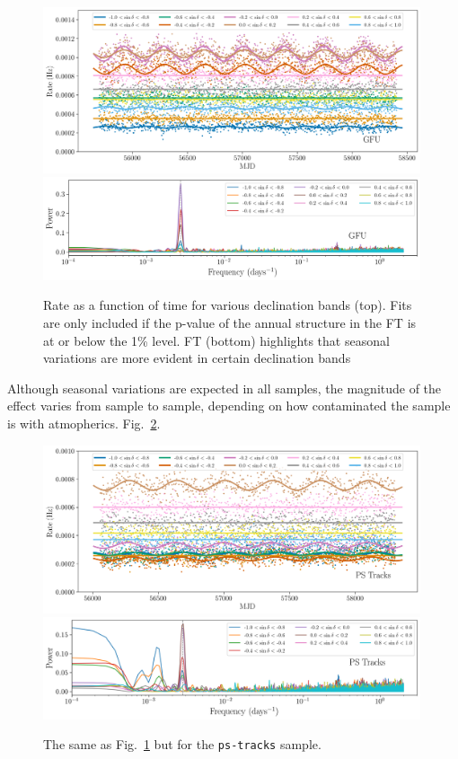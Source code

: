\begin{figure}
    \centering
    \includegraphics[width=0.99\textwidth]{images/gfu_online_dec_band_with_model.png}
    \includegraphics[width=0.99\textwidth]{images/gfu_online_dec_bands_FFT.png}
    \caption{Rate as a function of time for various declination bands (top). Fits are only included if the p-value of the annual structure in the FT is at or below the 1\% level. FT (bottom) highlights that seasonal variations are more evident in certain declination bands}
    \label{fig:dec_bands}
\end{figure}

Although seasonal variations are expected in all samples, the magnitude of the effect varies from sample to sample, depending on how contaminated the sample is with atmopherics. Fig.~\ref{fig:dec_bands_ps_tracks}.

\begin{figure}
    \centering
    \includegraphics[width=0.99\textwidth]{images/ps_tracks_dec_band_with_model.png}
    \includegraphics[width=0.99\textwidth]{images/ps_tracks_dec_bands_FFT.png}
    \caption{The same as Fig.~\ref{fig:dec_bands} but for the \texttt{ps-tracks} sample.}
    \label{fig:dec_bands_ps_tracks}
\end{figure}

